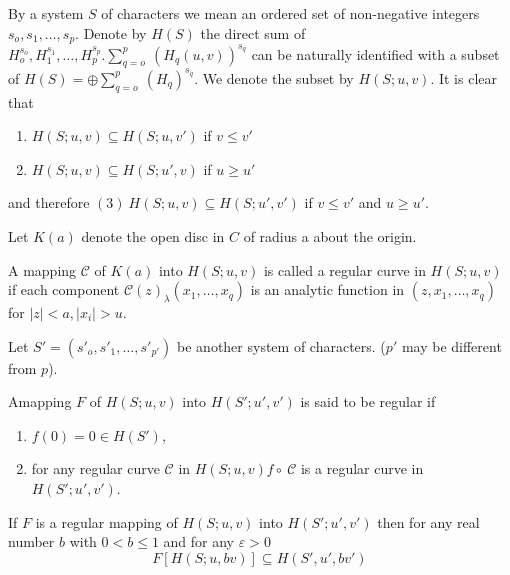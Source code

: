 \begin{defi*}%
  By a system $S$ of characters we mean an ordered set of non-negative
  integers $s_o,  s_1,  \ldots ,  s_p$. Denote by $H(S)$ the direct
  sum of $H^{s_o}_o,  H^{s_1}_1,  \ldots,
  H^{s_p}_p. \sum\limits_{q=o}^p ~(H_q(u,  v))^{s_q}$ can be naturally
  identified with a subset of $H(S) = \oplus \sum\limits_{q=o}^p ~
  (H_q)^{s_q}$. We denote the subset by $H(S; u,  v)$. It is clear
  that  
  \begin{enumerate}[\rm (1)]
  \item $H(S; u,  v) \subseteq H(S; u,  v')$ \quad if   $v \le v'$
  \item $H(S; u,  v) \subseteq H(S; u',  v)$ \quad if $u \ge u'$
  \end{enumerate}
  and therefore $(3) ~ H(S; u,  v) \subseteq H(S; u',  v')$ if $v \le
  v'$ and $u \ge u'$. 
\end{defi*}

Let $K(a)$ denote the open disc in $C$ of radius a about the origin.

\begin{defi*}%
  A mapping $\mathscr{C}$ of $K(a)$ into $H(S;u,  v)$ is called a
  regular curve in $H(S; u,  v)$ if each component
  $\mathscr{C}(z)_\lambda (x_1,  \ldots,  x_q)$ is an analytic
  function in $(z,  x_1,  \ldots,  x_q)$ for $| z | <  a,  | x_i | >
  u$. 
\end{defi*}

Let $S' = (s'_{o},  s'_{1},  \ldots,  s'_{p'})$ be another system of
characters. ($p'$ may be different from $p$). 

\begin{defi*}%
  A\pageoriginale mapping $F$ of $H(S; u,  v)$ into $H(S'; u',  v')$ is said to be regular if 
  \begin{enumerate}[\rm (i)]
  \item $f(0) = 0 \in H(S')$, 
  \item for any regular curve $\mathscr{C}$ in $H(S; u,  v) f \circ
    ~\mathscr{C}$ is a regular curve in $H(S'; u',  v')$. 
  \end{enumerate}
\end{defi*}

\begin{proposition}\label{chap1:sec1.2:prop1}%
  If $F$ is a regular mapping of $H(S; u,  v)$ into $H(S'; u',  v')$
  then for any real number $b$ with $0 < b \le  1$ and for any
  $\varepsilon > 0$ 
  $$
  F[H(S; u,  bv)] \subseteq H(S',  u',   bv')
  $$
\end{proposition}

